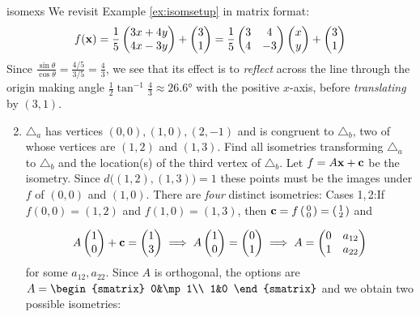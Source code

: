 \begin{examples}{}{isomexs}
	\exstart We revisit Example \ref{ex:isomsetup} in matrix format:
	\[
		f({\mathbf{x}})=\frac 15\begin{pmatrix}3x+4y\\4x-3y\end{pmatrix}+\begin{pmatrix}3\\1\end{pmatrix} =\frac 15
		\begin{pmatrix}
			3&4\\
			4&-3
		\end{pmatrix}
		\begin{pmatrix}x\\y\end{pmatrix}+\begin{pmatrix}3\\1\end{pmatrix}
	\]
	Since $\frac{\sin\theta}{\cos\theta}=\frac{4/5}{3/5}=\frac 43$, we see that its effect is to \emph{reflect} across the line through the origin making angle $\frac 12\tan^{-1}\frac 43\approx \ang{26.6}$ with the positive $x$-axis, before \emph{translating} by $(3,1)$.
	
	\begin{enumerate}\setcounter{enumi}{1}
		\item\label{ex:isomexs2} $\triangle_a$ has vertices $(0,0),(1,0),(2,-1)$ and is congruent to $\triangle_b$, two of whose vertices are $(1,2)$ and $(1,3)$. Find all isometries transforming $\triangle_a$ to $\triangle_b$ and the location(s) of the third vertex of $\triangle_b$.\smallbreak
	Let $f=A\vx+\vc$ be the isometry. Since $d\bigl((1,2),(1,3)\bigr)=1$ these points must be the images under $f$ of $(0,0)$ and $(1,0)$. There are \emph{four} distinct isometries:
	\smallbreak
	Cases 1,\,2:\lstsp If $f(0,0)=(1,2)$ and $f(1,0)=(1,3)$, then $\vc=f\stwovec 00=\stwovec 12$ and\par
	\begin{minipage}[t]{0.75\linewidth}\vspace{-10pt}
	  \begin{gather*}
	  	A\begin{pmatrix}1\\0\end{pmatrix}+{\mathbf{c}}=\begin{pmatrix}1\\3\end{pmatrix}\implies A\begin{pmatrix}1\\0\end{pmatrix}=\begin{pmatrix}0\\1\end{pmatrix}   \implies A=
	  	\begin{pmatrix}
	 		0&a_{12}\\
	  	1&a_{22}
	  	\end{pmatrix}
	  \end{gather*}
	  for some $a_{12},a_{22}$. Since $A$ is orthogonal, the options are $A=
	  \begin{smatrix}
	  	0&\mp 1\\
	  	1&0
	  \end{smatrix}$
	  and we obtain two possible isometries:
	  \begin{itemize}
	    \item $\textcolor{blue}{f_1(\vx)=
	    \begin{smatrix}
	  		0&-1\\
	  		1&0
	    \end{smatrix}
}
\end{itemize}
\end{minipage}
\end{enumerate}
\end{examples}

